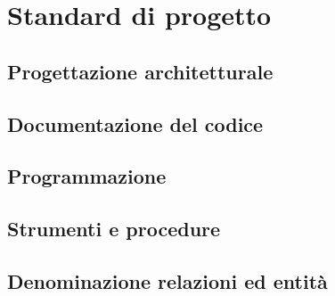 \documentclass[../DefinizioneDiProdotto.tex]{subfiles}
\begin{document}
	\section{Standard di progetto}	
		\subsection{Progettazione architetturale}
		\subsection{Documentazione del codice}
		\subsection{Programmazione}
		\subsection{Strumenti e procedure}
		\subsection{Denominazione relazioni ed entità}
\end{document}
